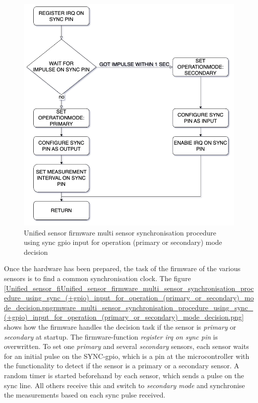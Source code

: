 \begin{figure}
\centering
\includegraphics{./generated_images/border_Unified_sensor_firmware_multi_sensor_synchronisation_procedure_using_sync_(+gpio)_input_for_operation_(primary_or_secondary)_mode_decision.png}
\caption{Unified sensor firmware multi sensor synchronisation procedure
using sync \gls{gpio} input for operation (primary or secondary) mode
decision
\label{Unified_sensor_firmware_multi_sensor_synchronisation_procedure_using_sync_(+gpio)_input_for_operation_(primary_or_secondary)_mode_decision.png}}
\end{figure}

Once the hardware has been prepared, the task of the firmware of the
various sensors is to find a common synchronisation clock. The figure
\ref{Unified_sensor_fiUnified_sensor_firmware_multi_sensor_synchronisation_procedure_using_sync_(+gpio)_input_for_operation_(primary_or_secondary)_mode_decision.pngrmware_multi_sensor_synchronisation_procedure_using_sync_(+gpio)_input_for_operation_(primary_or_secondary)_mode_decision.png}
shows how the firmware handles the decision task if the sensor is
\emph{primary} or \emph{secondary} at startup. The firmware-function
\emph{register irq on sync pin} is overwritten. To set one
\emph{primary} and several \emph{secondary} sensors, each sensor waits
for an initial pulse on the SYNC-\gls{gpio}, which is a pin at the
microcontroller with the functionality to detect if the sensor is a
primary or a secondary sensor. A random timer is started beforehand by
each sensor, which sends a pulse on the sync line. All others receive
this and switch to \emph{secondary mode} and synchronise the
measurements based on each sync pulse received.

